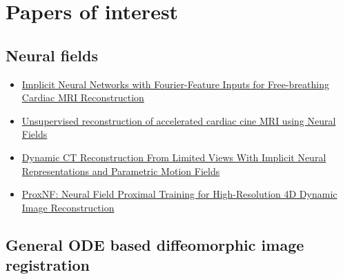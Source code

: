 \documentclass{article}
\begin{document}
\section{Papers of interest}

\subsection{Neural fields}

\begin{itemize}
    \item \href{https://arxiv.org/abs/2305.06822}{Implicit Neural Networks with Fourier-Feature Inputs for Free-breathing Cardiac MRI Reconstruction}
    \item \href{https://arxiv.org/abs/2307.14363}{Unsupervised reconstruction of accelerated cardiac cine MRI using Neural Fields}
    \item \href{https://openaccess.thecvf.com/content/ICCV2021/html/Reed_Dynamic_CT_Reconstruction_From_Limited_Views_With_Implicit_Neural_Representations_ICCV_2021_paper.html}{Dynamic CT Reconstruction From Limited Views With Implicit Neural Representations and Parametric Motion Fields}
    \item \href{https://arxiv.org/pdf/2403.03860}{ProxNF: Neural Field Proximal Training for High-Resolution 4D Dynamic Image Reconstruction}
\end{itemize}

\subsection{General ODE based diffeomorphic image registration}
\end{document}
